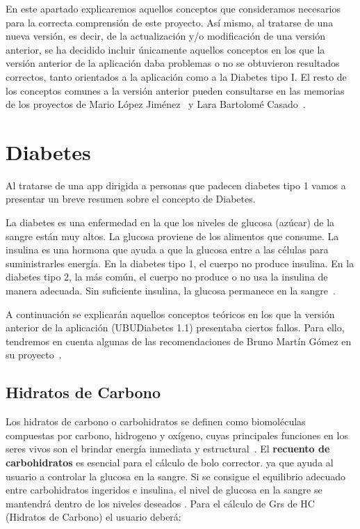 
En este apartado explicaremos aquellos conceptos que consideramos necesarios para la correcta comprensión de este proyecto.
Así mismo, al tratarse de una nueva versión, es decir, de la actualización y/o modificación de una versión anterior, se ha decidido incluir únicamente aquellos conceptos en los que la versión anterior de la aplicación daba problemas o no se obtuvieron resultados correctos, tanto orientados a la aplicación como a la Diabetes tipo I. El resto de los conceptos comunes a la versión anterior pueden consultarse en las memorias de los proyectos de Mario López Jiménez~\cite{mario2016} y Lara Bartolomé Casado~\cite{larab2015}.

\section{Diabetes}
Al tratarse de una app dirigida a personas que padecen diabetes tipo 1 vamos a presentar un breve resumen sobre el concepto de Diabetes.

La diabetes es una enfermedad en la que los niveles de glucosa (azúcar) de la sangre están muy altos. La glucosa proviene de los alimentos que consume. La insulina es una hormona que ayuda a que la glucosa entre a las células para suministrarles energía. En la diabetes tipo 1, el cuerpo no produce insulina. En la diabetes tipo 2, la más común, el cuerpo no produce o no usa la insulina de manera adecuada. Sin suficiente insulina, la glucosa permanece en la sangre~\cite{medlineplus}.

A continuación se explicarán aquellos conceptos teóricos en los que la versión anterior de la aplicación (UBUDiabetes 1.1) presentaba ciertos fallos. Para ello, tendremos en cuenta algunas de las recomendaciones de Bruno Martín Gómez en su proyecto~\cite{bruno2017}.

\subsection{Hidratos de Carbono}
Los hidratos de carbono o carbohidratos se definen como biomoléculas compuestas por carbono, hidrogeno y oxígeno, cuyas principales funciones en los seres vivos son el brindar energía inmediata y estructural~\cite{wiki:carbs}.
El \textbf{recuento de carbohidratos} es esencial para el cálculo de bolo corrector. ya que ayuda al usuario a controlar la glucosa en la sangre. Si se consigue el equilibrio adecuado entre carbohidratos ingeridos e insulina, el nivel de glucosa en la sangre se mantendrá dentro de los niveles deseados \cite{larab2015}.
Para el cálculo de Grs de HC (Hidratos de Carbono) el usuario deberá:

